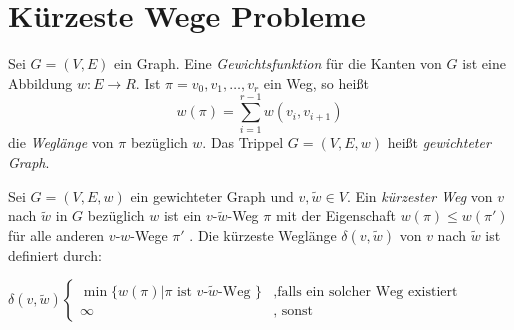 \section{Kürzeste Wege Probleme}
\begin{definition}
Sei $G=(V,E)$ ein Graph. Eine \emph{Gewichtsfunktion} für die Kanten von $G$ ist eine Abbildung $w \colon E \to R$. Ist $\pi=v_0,v_1,\ldots,v_r$ ein Weg, so heißt
\[
w(\pi) = \sum_{i=1}^{r-1}w(v_i,v_{i+1})
\]
die \emph{Weglänge} von $\pi$ bezüglich $w$. Das Trippel $G=(V,E,w)$ heißt \emph{gewichteter Graph}. 
\end{definition}
\begin{definition}
	\label{def:negative_gewichte}
Sei $G=(V,E,w)$  ein gewichteter Graph und $v, \tilde{w} \in  V$. Ein \emph{kürzester Weg} von $v$ nach $\tilde{w}$  in $G$  bezüglich $w$ ist ein $v\text{-} \tilde{w}$-Weg $\pi$  mit der Eigenschaft $w(\pi) \le w(\pi')$  für alle anderen $v\text{-}w$-Wege $\pi'$ .
Die kürzeste Weglänge $\delta(v,\tilde{w})$  von $v$ nach $\tilde{w}$ ist definiert durch:

\begin{center}$\delta(v,\tilde{w}) \begin{cases}
	\min \{w(\pi) | \pi \text{ ist $v$-$\tilde{w}$-Weg  }\} &, \text{falls ein solcher Weg existiert} \\
	\infty &, \text{ sonst}
\end{cases}$ \end{center}
\end{definition}


